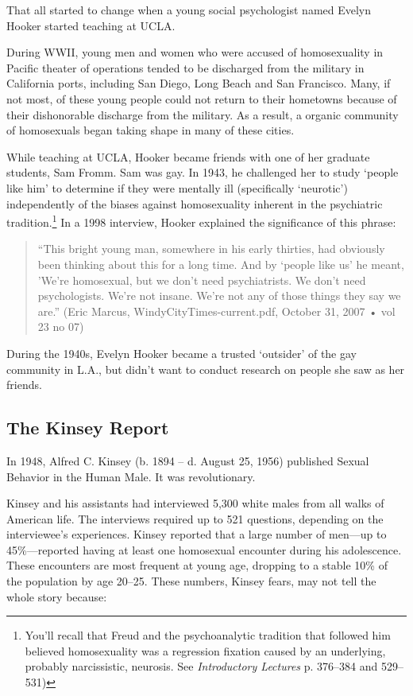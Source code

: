\begin{refsection}
That all started to change when a young social psychologist named Evelyn Hooker started teaching at UCLA.

During WWII, young men and women who were accused of homosexuality in Pacific theater of operations tended to be discharged from the military in California ports, including San Diego, Long Beach and San Francisco. Many, if not most, of these young people could not return to their hometowns because of their dishonorable discharge from the military. As a result, a organic community of homosexuals began taking shape in many of these cities.

While teaching at UCLA, Hooker became friends with one of her graduate students, Sam Fromm. Sam was gay. In 1943, he challenged her to study `people like him' to determine if they were mentally ill (specifically `neurotic') independently of the biases against homosexuality inherent in the psychiatric tradition.\footnote{You'll recall that Freud and the psychoanalytic tradition that followed him believed homosexuality was a regression fixation caused by an underlying, probably narcissistic, neurosis. See \emph{Introductory Lectures} p. 376--384 and 529--531)} In a 1998 interview, Hooker explained the significance of this phrase:

\begin{quote}

``This bright young man, somewhere in his early thirties, had obviously been thinking about this for a long time. And by `people like us' he meant, 'We're homosexual, but we don't need psychiatrists. We don't need psychologists. We're not insane. We're not any of those things they say we are.'' (Eric Marcus, WindyCityTimes-current.pdf, October 31, 2007 • vol 23 no 07)
\end{quote}

During the 1940s, Evelyn Hooker became a trusted `outsider' of the gay community in L.A., but didn't want to conduct research on people she saw as her friends.

\subsection{The Kinsey Report}
\label{thekinseyreport}

In 1948, Alfred C. Kinsey (b. 1894 – d. August 25, 1956) published Sexual Behavior in the Human Male. It was revolutionary.

Kinsey and his assistants had interviewed 5,300 white males from all walks of American life. The interviews required up to 521 questions, depending on the interviewee's experiences. Kinsey reported that a large number of men---up to 45\%---reported having at least one homosexual encounter during his adolescence. These encounters are most frequent at young age, dropping to a stable 10\% of the population by age 20--25. These numbers, Kinsey fears, may not tell the whole story because:


\end{refsection}
